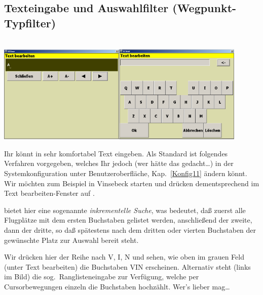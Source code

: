\subsection{Texteingabe und Auswahlfilter (Wegpunkt-Typfilter)}\label{Texteingabe}\label{Filter}
\begin{center}
\blink~\blink~\blink~\blink~\\[1em]
 \includegraphics[width=6cm]{Bilder/Texteingabe2.png}\qquad \includegraphics[width=6cm]{Bilder/Texteingabe1.png}
\end{center}
Ihr könnt in \xc sehr komfortabel Text eingeben.  Als Standard ist folgendes Verfahren vorgegeben, welches Ihr jedoch (wer hätte das gedacht\dots) in der Systemkonfiguration unter Benutzeroberfläche, Kap.\  \ref{Konfig11} ändern könnt. Wir möchten zum Beispiel in \textsf{Vinsebeck} starten und drücken dementsprechend im Text bearbeiten-Fenster auf .

\xc bietet hier eine sogenannte\textsl{ inkrementelle Suche}, was bedeutet, daß zuerst alle Flugplätze mit
dem ersten Buchstaben gelistet werden, anschließend der zweite, dann der dritte, so daß spätestens nach
dem dritten oder vierten Buchstaben der gewünschte Platz zur Auswahl bereit steht.

Wir drücken hier der Reihe nach \textsf{V, I, N} und sehen, wie oben im grauen Feld  (unter \textsf{Text bearbeiten})
die Buchstaben \textsf{VIN} erscheinen.  Alternativ steht (links im Bild) die
sog.\ Ranglisteneingabe zur Verfügung, welche per Cursorbewegungen einzeln die Buchstaben hochzählt.
Wer's lieber mag\dots

